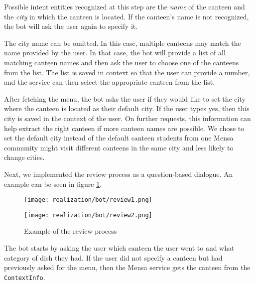 Possible intent entities recognized at this step are the \emph{name} of the canteen and the \emph{city} in which the canteen is located.
If the canteen's name is not recognized, the bot will ask the user again to specify it. 

The city name can be omitted. In this case, multiple canteens may match the name provided by the user. In that case, the bot will provide a list of all matching canteen names and then ask the user to choose one of the canteens from the list. The list is saved in context so that the user can provide a number, and the service can then select the appropriate canteen from the list.

After fetching the menu, the bot asks the user if they would like to set the city where the canteen is located as their default city. If the user types yes, then this city is saved in the context of the user. On further requests, this information can help extract the right canteen if more canteen names are possible. 
We chose to set the default city instead of the default canteen students from one Mensa community might visit different canteens in the same city and less likely to change cities. 

Next, we implemented the review process as a question-based dialogue. An example can be seen in figure \ref{fig:addReview}.


\begin{figure}[h]
    \begin{minipage}{0.5\textwidth}
        \texttt{[image: realization/bot/review1.png]} 
    \end{minipage}
    \begin{minipage}{0.5\textwidth}
        \texttt{[image: realization/bot/review2.png]}
        
    \end{minipage}
    \caption{Example of the review process}
    \label{fig:addReview}
\end{figure}

The bot starts by asking the user which canteen the user went to and what category of dish they had. If the user did not specify a canteen but had previously asked for the menu, then the Mensa service gets the canteen from the \texttt{ContextInfo}. 

